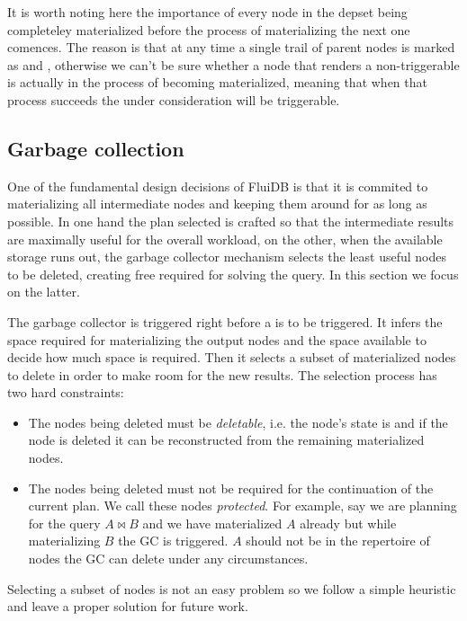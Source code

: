It is worth noting here the importance of every node in the depset
being completeley materialized before the process of materializing the
next one comences. The reason is that at any time a single trail of
parent nodes is marked as  and , otherwise we can't
be sure whether a  node that renders a 
non-triggerable is actually in the process of becoming materialized,
meaning that when that process succeeds the  under
consideration will be triggerable.

\subsection{Garbage collection}
\label{sec:gc}

One of the fundamental design decisions of FluiDB is that it is
commited to materializing all intermediate nodes and keeping them
around for as long as possible. In one hand the plan selected is
crafted so that the intermediate results are maximally useful for the
overall workload, on the other, when the available storage runs out,
the garbage collector mechanism selects the least useful nodes to be
deleted, creating free required for solving the query. In this section
we focus on the latter.

The garbage collector is triggered right before a  is to be
triggered. It infers the space required for materializing the output
nodes and the space available to decide how much space is
required. Then it selects a subset of materialized nodes to delete in
order to make room for the new results. The selection process has two
hard constraints:

\begin{itemize}
\item The nodes being deleted must be \emph{deletable}, i.e. the
  node's state is  and if the node is deleted it can be
  reconstructed from the remaining materialized nodes.
\item The nodes being deleted must not be required for the
  continuation of the current plan. We call these nodes
  \emph{protected}. For example, say we are planning for the query
  \(A \Join B\) and we have materialized \(A\) already but while
  materializing \(B\) the GC is triggered. \(A\) should not be in the
  repertoire of nodes the GC can delete under any circumstances.
\end{itemize}

Selecting a subset of nodes is not an easy problem so we follow a
simple heuristic and leave a proper solution for future work.

